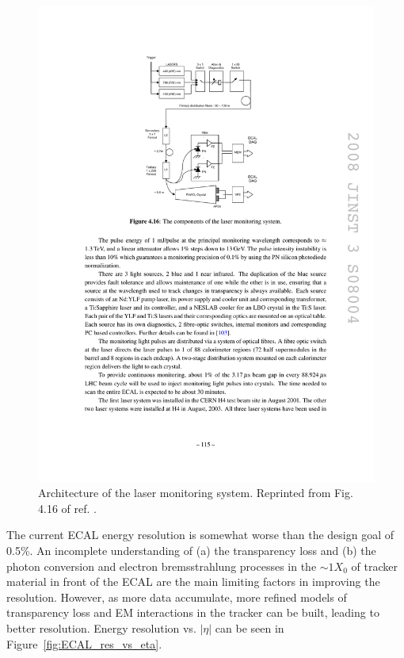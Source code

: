 \documentclass[dissertation.tex]{subfiles}
\begin{document}
\begin{figure}
	\centering
	\includegraphics[scale=1.0]{ECAL_laser_system}
	\caption{Architecture of the laser monitoring system.  Reprinted from Fig. 4.16 of ref. \cite{CMS_detector_paper}.}
	\label{fig:ECAL_laser_system}
\end{figure}

The current ECAL energy resolution is somewhat worse than the design goal of 0.5\%.  An incomplete understanding of (a) the transparency loss and (b) the photon conversion and electron bremsstrahlung processes in the $\sim1X_{0}$ of tracker material in front of the ECAL are the main limiting factors in improving the resolution.  However, as more data accumulate, more refined models of transparency loss and EM interactions in the tracker can be built, leading to better resolution.  Energy resolution vs. $|\eta|$ can be seen in Figure~\ref{fig:ECAL_res_vs_eta}.
\end{document}
